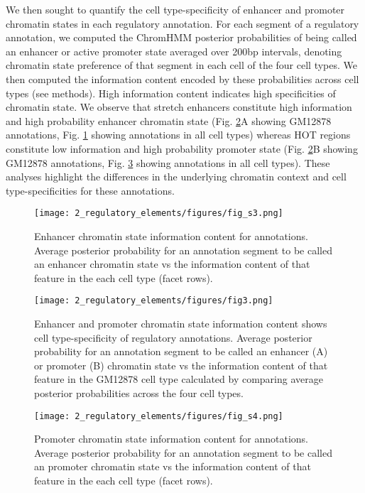 We then sought to quantify the cell type-specificity of enhancer and promoter chromatin states in each regulatory annotation. For each segment of a regulatory annotation, we computed the ChromHMM posterior probabilities of being called an enhancer or active promoter state averaged over 200bp intervals, denoting chromatin state preference of that segment in each cell of the four cell types. We then computed the information content encoded by these probabilities across cell types (see methods). High information content indicates high specificities of chromatin state. We observe that stretch enhancers constitute high information and high probability enhancer chromatin state (Fig. \ref{fig:c1_f3}A showing GM12878 annotations, Fig. \ref{fig:c1_fs3} showing annotations in all cell types) whereas HOT regions constitute low information and high probability promoter state (Fig. \ref{fig:c1_f3}B showing GM12878 annotations, Fig. \ref{fig:c1_fs4} showing annotations in all cell types). These analyses highlight the differences in the underlying chromatin context and cell type-specificities for these annotations.

\begin{figure}
    \centering
    \texttt{[image: 2\_regulatory\_elements/figures/fig\_s3.png]}
    \caption[Enhancer chromatin state information content for annotations]{Enhancer chromatin state information content for annotations. Average posterior probability for an annotation segment to be called an enhancer chromatin state vs the information content of that feature in the each cell type (facet rows).}
    \label{fig:c1_fs3}
\end{figure}

\begin{figure}
    \centering
    \texttt{[image: 2\_regulatory\_elements/figures/fig3.png]}
    \caption[Enhancer and promoter chromatin state information content shows cell type-specificity of regulatory annotations]{Enhancer and promoter chromatin state information content shows cell type-specificity of regulatory annotations. Average posterior probability for an annotation segment to be called an enhancer (A) or promoter (B) chromatin state vs the information content of that feature in the GM12878 cell type calculated by comparing average posterior probabilities across the four cell types.}
    \label{fig:c1_f3}
\end{figure}

\begin{figure}
    \centering
    \texttt{[image: 2\_regulatory\_elements/figures/fig\_s4.png]}
    \caption[Promoter chromatin state information content for annotations]{Promoter chromatin state information content for annotations. Average posterior probability for an annotation segment to be called an promoter chromatin state vs the information content of that feature in the each cell type (facet rows).}
    \label{fig:c1_fs4}
\end{figure}

